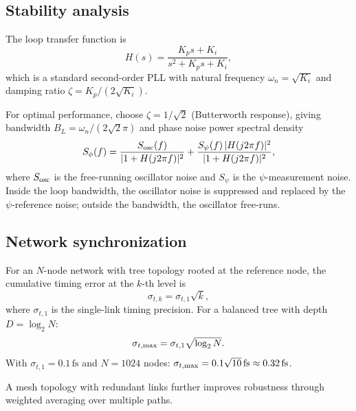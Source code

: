 \documentclass[aps,prd,twocolumn,superscriptaddress,nofootinbib]{revtex4-2}
\newcommand{\fs}{\,\mathrm{fs}}
\begin{document}
\subsection{Stability analysis}\label{sec:stability}

The loop transfer function is
\begin{equation}\label{eq:loop-TF}
H(s) = \frac{K_p s + K_i}{s^2 + K_p s + K_i},
\end{equation}
which is a standard second-order PLL with natural frequency
$\omega_n = \sqrt{K_i}$ and damping ratio
$\zeta = K_p/(2\sqrt{K_i})$.

For optimal performance, choose $\zeta = 1/\sqrt{2}$ (Butterworth
response), giving bandwidth $B_L = \omega_n/(2\sqrt{2}\pi)$ and
phase noise power spectral density
\begin{equation}\label{eq:PLL-noise}
S_\phi(f) = \frac{S_{\rm osc}(f)}{|1+H(j2\pi f)|^2}
+ \frac{S_{\psi}(f)\,|H(j2\pi f)|^2}{|1+H(j2\pi f)|^2},
\end{equation}
where $S_{\rm osc}$ is the free-running oscillator noise and $S_\psi$
is the $\psi$-measurement noise. Inside the loop bandwidth, the
oscillator noise is suppressed and replaced by the $\psi$-reference
noise; outside the bandwidth, the oscillator free-runs.

\subsection{Network synchronization}\label{sec:network-sync}

For an $N$-node network with tree topology rooted at the reference
node, the cumulative timing error at the $k$-th level is
\begin{equation}\label{eq:network-error}
\sigma_{t,k} = \sigma_{t,1}\sqrt{k},
\end{equation}
where $\sigma_{t,1}$ is the single-link timing precision. For a
balanced tree with depth $D = \log_2 N$:
\begin{equation}\label{eq:network-depth}
\sigma_{t,\rm max} = \sigma_{t,1}\sqrt{\log_2 N}.
\end{equation}
With $\sigma_{t,1} = 0.1\fs$ and $N = 1024$ nodes:
$\sigma_{t,\rm max} = 0.1\sqrt{10}\fs \approx 0.32\fs$.

A mesh topology with redundant links further improves robustness
through weighted averaging over multiple paths.

\end{document}
